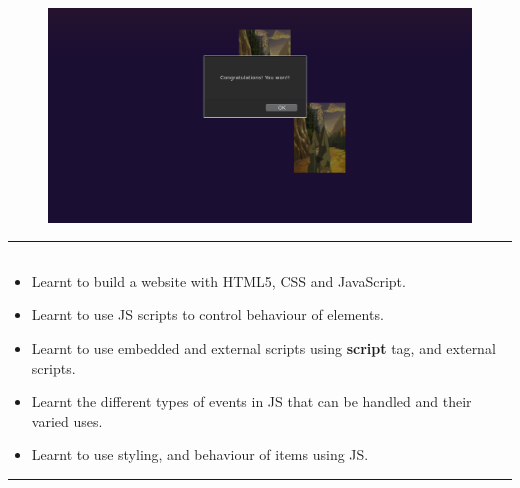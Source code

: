 \documentclass[12pt,letterpaper]{article}
\begin{document}
\begin{figure}[h!]
    \centering
    \includegraphics[width = \textwidth]{MemoryGame/Pics/game4.png}
\end{figure}

\hrule

\subsection*{}
\renewcommand{\labelitemi}{$\textendash$}
\begin{itemize}
    \item Learnt to build a website with HTML5, CSS and JavaScript.
    \item Learnt to use JS scripts to control behaviour of elements.
    \item Learnt to use embedded and external scripts using \textbf{script} tag, and external scripts.
    \item Learnt the different types of events in JS that can be handled and their varied uses.
    \item Learnt to use styling, and behaviour of items using JS.
\end{itemize}
\hrule
\end{document}
